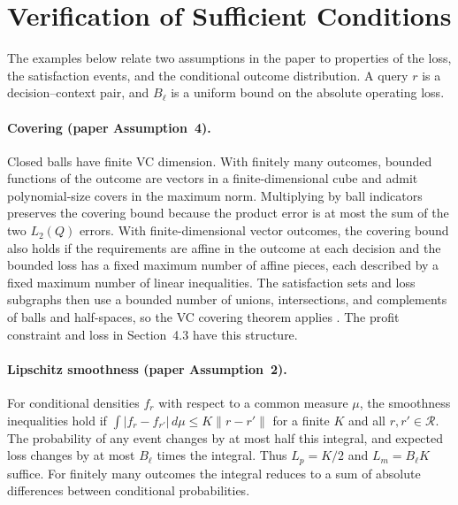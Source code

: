 \section{Verification of Sufficient Conditions}
The examples below relate two assumptions in the paper to properties of the loss, the satisfaction events, and the conditional outcome distribution. A query \(r\) is a decision--context pair, and \(B_\ell\) is a uniform bound on the absolute operating loss.

\paragraph{Covering (paper Assumption~4).}
Closed balls have finite VC dimension. With finitely many outcomes, bounded functions of the outcome are vectors in a finite-dimensional cube and admit polynomial-size covers in the maximum norm. Multiplying by ball indicators preserves the covering bound because the product error is at most the sum of the two \(L_2(Q)\) errors. With finite-dimensional vector outcomes, the covering bound also holds if the requirements are affine in the outcome at each decision and the bounded loss has a fixed maximum number of affine pieces, each described by a fixed maximum number of linear inequalities. The satisfaction sets and loss subgraphs then use a bounded number of unions, intersections, and complements of balls and half-spaces, so the VC covering theorem applies \citep[Section~2.6]{vanderVaartWellner1996}. The profit constraint and loss in Section~4.3 have this structure.

\paragraph{Lipschitz smoothness (paper Assumption~2).}
For conditional densities \(f_r\) with respect to a common measure \(\mu\), the smoothness inequalities hold if \(\int |f_r-f_{r'}|\,d\mu\le K\|r-r'\|\) for a finite \(K\) and all \(r,r'\in\mathcal R\). The probability of any event changes by at most half this integral, and expected loss changes by at most \(B_\ell\) times the integral. Thus \(L_p=K/2\) and \(L_m=B_\ell K\) suffice. For finitely many outcomes the integral reduces to a sum of absolute differences between conditional probabilities.
